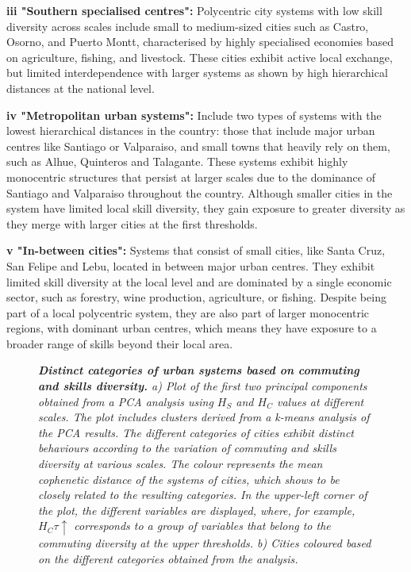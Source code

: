 \documentclass[11pt, a4paper]{article}
\begin{document}
\textbf{iii "Southern specialised centres":} Polycentric city systems with low skill diversity across scales include small to medium-sized cities such as Castro, Osorno, and Puerto Montt, characterised by highly specialised economies based on agriculture, fishing, and livestock. These cities exhibit active local exchange, but limited interdependence with larger systems as shown by high hierarchical distances at the national level.

\textbf{iv "Metropolitan urban systems":} Include two types of systems with the lowest hierarchical distances in the country: those that include major urban centres like Santiago or Valparaiso, and small towns that heavily rely on them, such as Alhue, Quinteros and Talagante. These systems exhibit highly monocentric structures that persist at larger scales due to the dominance of Santiago and Valparaiso throughout the country. Although smaller cities in the system have limited local skill diversity, they gain exposure to greater diversity as they merge with larger cities at the first thresholds.

\textbf{v "In-between cities":} Systems that consist of small cities, like Santa Cruz, San Felipe and Lebu, located in between major urban centres. They exhibit limited skill diversity at the local level and are dominated by a single economic sector, such as forestry, wine production, agriculture, or fishing. Despite being part of a local polycentric system, they are also part of larger monocentric regions, with dominant urban centres, which means they have exposure to a broader range of skills beyond their local area.

\begin{figure}[h!]
\centering
{}
\caption{\textit{\textbf{Distinct categories of urban systems based on commuting and skills diversity.} a) Plot of the first two principal components obtained from a PCA analysis using $H_{S}$ and $H_{C}$ values at different scales. The plot includes clusters derived from a k-means analysis of the PCA results. The different categories of cities exhibit distinct behaviours according to the variation of commuting and skills diversity at various scales. The colour represents the mean cophenetic distance of the systems of cities, which shows to be closely related to the resulting categories. In the upper-left corner of the plot, the different variables are displayed, where, for example, $H_{C} \tau\uparrow$ corresponds to a group of variables that belong to the commuting diversity at the upper thresholds. b) Cities coloured based on the different categories obtained from the analysis. }}
\label{methods}
\end{figure}
\end{document}
